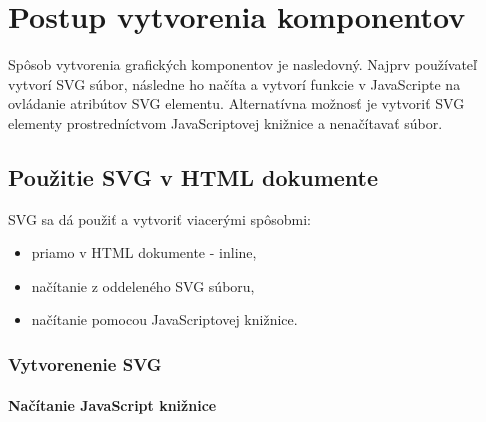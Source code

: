 \chapter{Postup vytvorenia komponentov}

Spôsob vytvorenia grafických komponentov je nasledovný. Najprv používateľ vytvorí SVG súbor, následne ho načíta a vytvorí funkcie v JavaScripte na ovládanie atribútov SVG elementu. 
Alternatívna možnosť je vytvoriť SVG elementy prostredníctvom JavaScriptovej knižnice a nenačítavať súbor. 

\section{Použitie SVG v HTML dokumente}

SVG sa dá použiť a vytvoriť viacerými spôsobmi:
\begin{itemize}
	\item priamo v HTML dokumente - inline, 
	\item načítanie z oddeleného SVG súboru,
	\item načítanie pomocou JavaScriptovej knižnice.
\end{itemize}


 \subsection{Vytvorenenie SVG }
 
 \subsubsection{Načítanie JavaScript knižnice}

